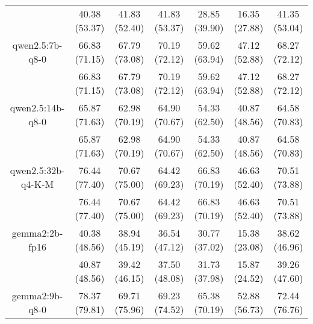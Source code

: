 \begin{table}[]
{\begin{tabular}{ccccccc}
      \multicolumn{1}{c|}{} & 40.38 (53.37) & 41.83 (52.40) & \multicolumn{1}{c|}{41.83 (53.37)} & 28.85 (39.90) & \multicolumn{1}{c|}{16.35 (27.88)} & 41.35 (53.04) \\
      \cline{1-7}


      \multicolumn{1}{c|}{qwen2.5:7b-q8-0} & 66.83 (71.15) & 67.79 (73.08) & \multicolumn{1}{c|}{70.19 (72.12)} & 59.62 (63.94) & \multicolumn{1}{c|}{47.12 (52.88)} & 68.27 (72.12) \\



      \multicolumn{1}{c|}{} & 66.83 (71.15) & 67.79 (73.08) & \multicolumn{1}{c|}{70.19 (72.12)} & 59.62 (63.94) & \multicolumn{1}{c|}{47.12 (52.88)} & 68.27 (72.12) \\
      \cline{1-7}


      \multicolumn{1}{c|}{qwen2.5:14b-q8-0} & 65.87 (71.63) & 62.98 (70.19) & \multicolumn{1}{c|}{64.90 (70.67)} & 54.33 (62.50) & \multicolumn{1}{c|}{40.87 (48.56)} & 64.58 (70.83) \\



      \multicolumn{1}{c|}{} & 65.87 (71.63) & 62.98 (70.19) & \multicolumn{1}{c|}{64.90 (70.67)} & 54.33 (62.50) & \multicolumn{1}{c|}{40.87 (48.56)} & 64.58 (70.83) \\
      \cline{1-7}


      \multicolumn{1}{c|}{qwen2.5:32b-q4-K-M} & 76.44 (77.40) & 70.67 (75.00) & \multicolumn{1}{c|}{64.42 (69.23)} & 66.83 (70.19) & \multicolumn{1}{c|}{46.63 (52.40)} & 70.51 (73.88) \\



      \multicolumn{1}{c|}{} & 76.44 (77.40) & 70.67 (75.00) & \multicolumn{1}{c|}{64.42 (69.23)} & 66.83 (70.19) & \multicolumn{1}{c|}{46.63 (52.40)} & 70.51 (73.88) \\
      \cline{1-7}


      \multicolumn{1}{c|}{gemma2:2b-fp16} & 40.38 (48.56) & 38.94 (45.19) & \multicolumn{1}{c|}{36.54 (47.12)} & 30.77 (37.02) & \multicolumn{1}{c|}{15.38 (23.08)} & 38.62 (46.96) \\



      \multicolumn{1}{c|}{} & 40.87 (48.56) & 39.42 (46.15) & \multicolumn{1}{c|}{37.50 (48.08)} & 31.73 (37.98) & \multicolumn{1}{c|}{15.87 (24.52)} & 39.26 (47.60) \\
      \cline{1-7}


      \multicolumn{1}{c|}{gemma2:9b-q8-0} & 78.37 (79.81) & 69.71 (75.96) & \multicolumn{1}{c|}{69.23 (74.52)} & 65.38 (70.19) & \multicolumn{1}{c|}{52.88 (56.73)} & 72.44 (76.76) \\




\end{tabular}}
\end{table}
